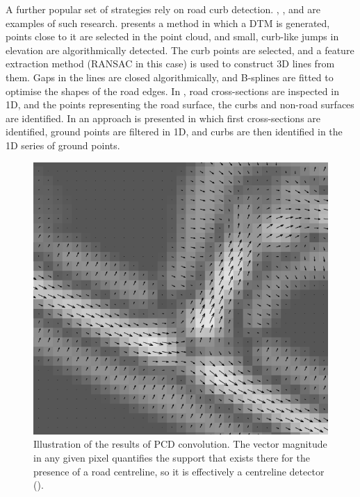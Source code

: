 A further popular set of strategies rely on road curb detection. \cite{vosselman_zhou_2009}, \cite{zhang_2010}, and \cite{yang_etal_2013} are examples of such research. \cite{vosselman_zhou_2009} presents a method in which a DTM is generated, points close to it are selected in the point cloud, and small, curb-like jumps in elevation are algorithmically detected. The curb points are selected, and a feature extraction method (RANSAC in this case) is used to construct 3D lines from them. Gaps in the lines are closed algorithmically, and B-splines are fitted to optimise the shapes of the road edges. In \cite{zhang_2010}, road cross-sections are inspected in 1D, and the points representing the road surface, the curbs and non-road surfaces are identified. In \cite{yang_etal_2013} an approach is presented in which first cross-sections are identified, ground points are filtered in 1D, and curbs are then identified in the 1D series of ground points.

\begin{figure}
    \includegraphics[width=\linewidth]{p2/figs/clode_etal_2007_01.png} 
    \caption{Illustration of the results of PCD convolution. The vector magnitude in any given pixel quantifies the support that exists there for the presence of a road centreline, so it is effectively a centreline detector (\cite{clode_etal_2007}).}
    \label{fig:phasecodeddisk}
\end{figure}

